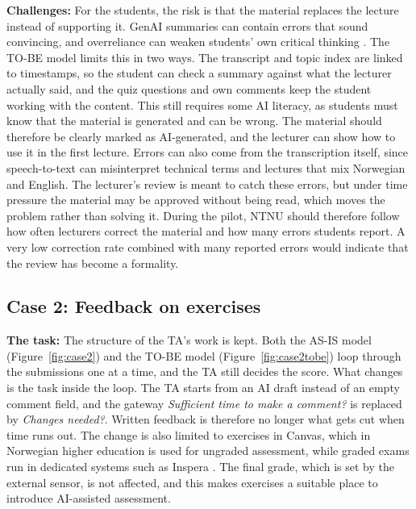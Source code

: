 \textbf{Challenges:}
For the students, the risk is that the material replaces the lecture instead of supporting it. GenAI summaries can contain errors that sound convincing, and overreliance can weaken students' own critical thinking \parencite{qian2025}. The TO-BE model limits this in two ways. The transcript and topic index are linked to timestamps, so the student can check a summary against what the lecturer actually said, and the quiz questions and own comments keep the student working with the content. This still requires some AI literacy, as students must know that the material is generated and can be wrong. The material should therefore be clearly marked as AI-generated, and the lecturer can show how to use it in the first lecture. Errors can also come from the transcription itself, since speech-to-text can misinterpret technical terms and lectures that mix Norwegian and English. The lecturer's review is meant to catch these errors, but under time pressure the material may be approved without being read, which moves the problem rather than solving it. During the pilot, NTNU should therefore follow how often lecturers correct the material and how many errors students report. A very low correction rate combined with many reported errors would indicate that the review has become a formality. 


\subsection{Case 2: Feedback on exercises}

\textbf{The task:}
The structure of the TA's work is kept. Both the AS-IS model (Figure~\ref{fig:case2}) and the TO-BE model (Figure~\ref{fig:case2tobe}) loop through the submissions one at a time, and the TA still decides the score. What changes is the task inside the loop. The TA starts from an AI draft instead of an empty comment field, and the gateway \textit{Sufficient time to make a comment?} is replaced by \textit{Changes needed?}. Written feedback is therefore no longer what gets cut when time runs out. The change is also limited to exercises in Canvas, which in Norwegian higher education is used for ungraded assessment, while graded exams run in dedicated systems such as Inspera \parencite{chirumamilla2021}. The final grade, which is set by the external sensor, is not affected, and this makes exercises a suitable place to introduce AI-assisted assessment.


